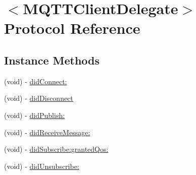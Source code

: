 \hypertarget{protocol_m_q_t_t_client_delegate-p}{\section{$<$M\-Q\-T\-T\-Client\-Delegate$>$ Protocol Reference}
\label{protocol_m_q_t_t_client_delegate-p}
}
\subsection*{Instance Methods}
\begin{DoxyCompactItemize}
\item 
(void) -\/ \hyperlink{protocol_m_q_t_t_client_delegate-p_abb74a5596c9ad44a7052211b93e37cc9}{did\-Connect\-:}
\item 
(void) -\/ \hyperlink{protocol_m_q_t_t_client_delegate-p_af2c500a4d472477e679d645c5b27d85c}{did\-Disconnect}
\item 
(void) -\/ \hyperlink{protocol_m_q_t_t_client_delegate-p_ae779c7d4627f8aa3e154b42b76433884}{did\-Publish\-:}
\item 
(void) -\/ \hyperlink{protocol_m_q_t_t_client_delegate-p_a6222052eaf37f65f0b535daac93b917b}{did\-Receive\-Message\-:}
\item 
(void) -\/ \hyperlink{protocol_m_q_t_t_client_delegate-p_a1ace3cd8729f0f4ae0f0b4426005fbc6}{did\-Subscribe\-:granted\-Qos\-:}
\item 
(void) -\/ \hyperlink{protocol_m_q_t_t_client_delegate-p_a0413071b5250d70186de525049240038}{did\-Unsubscribe\-:}
\end{DoxyCompactItemize}


